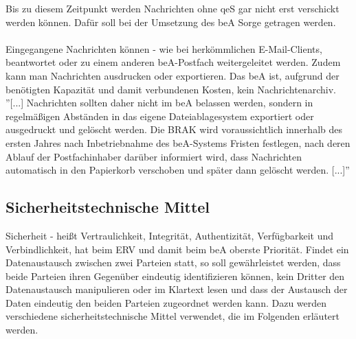 Bis zu diesem Zeitpunkt werden Nachrichten ohne qeS gar nicht erst verschickt werden können. Dafür soll bei der Umsetzung des beA Sorge getragen werden. \\
\\
Eingegangene Nachrichten können - wie bei herkömmlichen E-Mail-Clients, beantwortet oder zu einem anderen beA-Postfach weitergeleitet werden. Zudem kann man Nachrichten ausdrucken oder exportieren. Das beA ist, aufgrund der benötigten Kapazität und damit verbundenen Kosten, kein Nachrichtenarchiv. ''[...] Nachrichten sollten daher nicht im beA belassen werden, sondern in regelmäßigen Abständen in das eigene Dateiablagesystem exportiert oder ausgedruckt und gelöscht werden. Die BRAK wird voraussichtlich innerhalb des ersten Jahres nach Inbetriebnahme des beA-Systems Fristen festlegen, nach deren Ablauf der Postfachinhaber darüber informiert wird, dass Nachrichten automatisch in den Papierkorb verschoben und später dann gelöscht werden. [...]'' \cite{bea:bea:brak3-2015}

\subsection{Sicherheitstechnische Mittel}
Sicherheit - heißt Vertraulichkeit, Integrität, Authentizität, Verfügbarkeit und Verbindlichkeit, hat beim ERV und damit beim beA oberste Priorität. Findet ein Datenaustausch zwischen zwei Parteien statt, so soll gewährleistet werden, dass beide Parteien ihren Gegenüber eindeutig identifizieren können, kein Dritter den Datenaustausch manipulieren oder im Klartext lesen und dass der Austausch der Daten eindeutig den beiden Parteien zugeordnet werden kann. Dazu werden verschiedene sicherheitstechnische Mittel verwendet, die im Folgenden erläutert werden.

